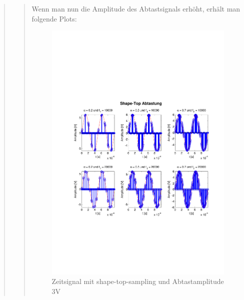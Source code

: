 \begin{quote}
\begin{quote}
    	Wenn man nun die Amplitude des Abtastsignals erhöht, erhält man folgende
    	Plots:
    	
    	\begin{figure}[H]
    \centering
        \includegraphics[scale=0.7, trim = 0cm 0cm 0cm 0cm,
        clip]{./Bilder/shape-top-zeit_3V}
            \caption{Zeitsignal mit shape-top-sampling und Abtastamplitude 3V}
  	    \end{figure}
  	    

\end{quote}
\end{quote}
